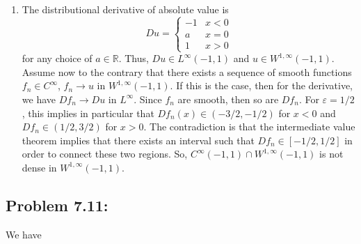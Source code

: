 \documentclass[letterpaper,twoside,11pt]{article}
\theoremstyle{mystyle}
\newcommand{\R}{{\mathbb R}}
\begin{document}
\begin{enumerate}
  \item The distributional derivative of absolute value is 
  \[Du = \left\{ {\begin{array}{*{20}{c}}
    { - 1}&{x < 0} \\ 
    a&{x = 0} \\ 
    1&{x > 0} 
  \end{array}} \right.\] for any choice of $a\in \R$. Thus, $Du \in L^\infty\left( -1,1 \right)$ and $u \in W^{1,\infty}\left( -1, 1 \right)$. Assume now to the contrary that there exists a sequence of smooth functions $f_n \in C^\infty$, $f_n \to u$ in $W^{1,\infty}\left( -1, 1 \right)$. If this is the case, then for the derivative, we have $Df_n \to Du$ in $L^\infty$. Since $f_n$ are smooth, then so are $Df_n$. For $\varepsilon = 1/2$, this implies in particular that $Df_n(x) \in \left( -3/2, -1/2 \right)$ for $x<0$ and $Df_n \in (1/2, 3/2)$ for $x>0$. The contradiction is that the intermediate value theorem implies that there exists an interval such that $Df_n \in [-1/2, 1/2]$ in order to connect these two regions. So, $C^\infty \left( -1, 1 \right)\cap W^{1,\infty}\left( -1, 1 \right)$ is not dense in $W^{1,\infty}\left( -1, 1 \right)$. 
\end{enumerate}



\subsection*{Problem 7.11:}
We have 
\end{document}
